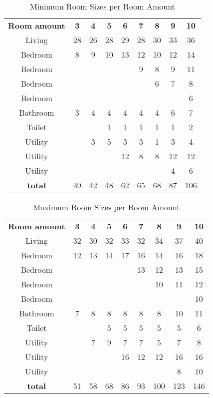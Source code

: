 \documentclass[a4paper, 12pt]{report}
\begin{document}
\begin{table}
\centering
\begin{tabular}{ ccccccccc }
\textbf{Room amount} & \textbf{3} & \textbf{4} & \textbf{5} & \textbf{6} & \textbf{7} & \textbf{8} & \textbf{9} & \textbf{10} \\
Living & 28 & 26 & 28 & 29 & 28 & 30 & 33 & 36 \\
Bedroom & 8 & 9 & 10 & 13 & 12 & 10 & 12 & 14 \\
Bedroom & & & & & 9 & 8 & 9 & 11 \\
Bedroom & & & & & & 6 & 7 & 8 \\
Bedroom & & & & & & & & 6 \\
Bathroom & 3 & 4 & 4 & 4 & 4 & 4 & 6 & 7 \\
Toilet & & & 1 & 1 & 1 & 1 & 1 & 2 \\
Utility & & 3 & 5 & 3 & 3 & 1 & 3 & 4 \\
Utility & & & & 12 & 8 & 8 & 12 & 12 \\
Utility & & & & & & & 4 & 6 \\
\textbf{total} & 39 & 42 & 48 & 62 & 65 & 68 & 87 & 106 \\
\end{tabular}
\caption{Minimum Room Sizes per Room Amount}
\label{tab:minimum-room-sizes-per-room-amount}
\end{table}

\begin{table}
\centering
\begin{tabular}{ ccccccccc }
\textbf{Room amount} & \textbf{3} & \textbf{4} & \textbf{5} & \textbf{6} & \textbf{7} & \textbf{8} & \textbf{9} & \textbf{10} \\
Living & 32 & 30 & 32 & 33 & 32 & 34 & 37 & 40 \\
Bedroom & 12 & 13 & 14 & 17 & 16 & 14 & 16 & 18 \\
Bedroom & & & & & 13 & 12 & 13 & 15 \\
Bedroom & & & & & & 10 & 11 & 12 \\
Bedroom & & & & & & & & 10 \\
Bathroom & 7 & 8 & 8 & 8 & 8 & 8 & 10 & 11 \\
Toilet & & & 5 & 5 & 5 & 5 & 5 & 6 \\
Utility & & 7 & 9 & 7 & 7 & 5 & 7 & 8 \\
Utility & & & & 16 & 12 & 12 & 16 & 16 \\
Utility & & & & & & & 8 & 10 \\
\textbf{total} & 51 & 58 & 68 & 86 & 93 & 100 & 123 & 146 \\
\end{tabular}
\caption{Maximum Room Sizes per Room Amount}
\label{tab:maximum-room-sizes-per-room-amount}
\end{table}
\end{document}
